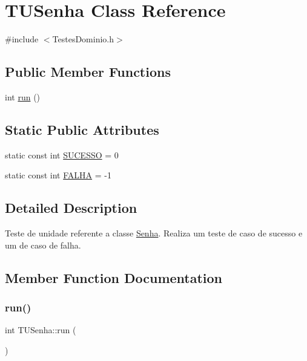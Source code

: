 \hypertarget{class_t_u_senha}{}\section{T\+U\+Senha Class Reference}
\label{class_t_u_senha}


{\ttfamily \#include $<$Testes\+Dominio.\+h$>$}

\subsection*{Public Member Functions}
\begin{DoxyCompactItemize}
\item 
int \hyperlink{class_t_u_senha_ac5ddea52ed42b828961f343b82074125}{run} ()
\end{DoxyCompactItemize}
\subsection*{Static Public Attributes}
\begin{DoxyCompactItemize}
\item 
static const int \hyperlink{class_t_u_senha_a1a1dabe034b25a899150c95acbc0684c}{S\+U\+C\+E\+S\+SO} = 0
\item 
static const int \hyperlink{class_t_u_senha_a71eb0d9005b2d36da6a8530c0dd31842}{F\+A\+L\+HA} = -\/1
\end{DoxyCompactItemize}


\subsection{Detailed Description}
Teste de unidade referente a classe \hyperlink{class_senha}{Senha}. Realiza um teste de caso de sucesso e um de caso de falha. 

\subsection{Member Function Documentation}
\mbox{\label{class_t_u_senha_ac5ddea52ed42b828961f343b82074125}} 
\subsubsection{\texorpdfstring{run()}{run()}}
{\footnotesize\ttfamily int T\+U\+Senha\+::run (\begin{DoxyParamCaption}{ }\end{DoxyParamCaption})}



